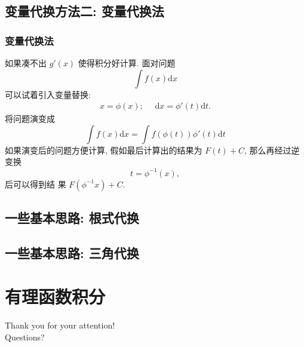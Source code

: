 \documentclass[
10pt,
aspectratio=43,
]{beamer}
\begin{document}
\subsection{变量代换方法二: 变量代换法}

\begin{frame}
	\frametitle{变量代换法}
	\everymath{\displaystyle}
	如果凑不出 $g'(x)$ 使得积分好计算.
	面对问题
	$$
		\int f(x)\mathrm{d}x
	$$
	可以试着引入变量替换:
	$$
		\begin{aligned}
			x=\phi(x);\,\,\,\, \,\,\,\,\mathrm{d}x=\phi'(t)\mathrm{d}t.
		\end{aligned}
	$$
	将问题演变成
	$$
		\int f(x)\mathrm{d}x=\int f(\phi(t))\phi'(t)\mathrm{d}t
	$$
	如果演变后的问题方便计算, 假如最后计算出的结果为 $F(t)+C$, 那么再经过逆变换
	$$
		t=\phi^{-1}(x),
	$$
	后可以得到结 果 $F(\phi^{-1}x)+C$.
\end{frame}

\subsection{一些基本思路: 根式代换}

\subsection{一些基本思路: 三角代换}

\section{有理函数积分}

\begin{frame}[plain]
	\vfill
	\centering
	{
		\centering \Huge \color{white} Thank you for your attention!\\[10pt]Questions?
	}
	\vfill
\end{frame}
\end{document}
